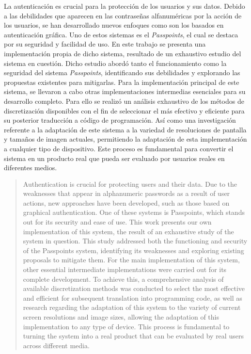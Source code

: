 \begin{resumen}
	La autenticación es crucial para la protección de los usuarios y sus datos. Debido a las debilidades que aparecen en las contraseñas alfanuméricas por la acción de los usuarios, se han desarrollado nuevos enfoques como son los basados en autenticación gráfica. Uno de estos sistemas es el \textit{Passpoints}, el cual se destaca por su seguridad y facilidad de uso. En este trabajo se presenta una implementación propia de dicho sistema, resultado de un exhaustivo estudio del sistema en cuestión. Dicho estudio abordó tanto el funcionamiento como la seguridad del sistema \textit{Passpoints}, identificando sus debilidades y explorando las propuestas existentes para mitigarlas. Para la implementación principal de este sistema, se llevaron a cabo otras implementaciones intermedias esenciales para su desarrollo completo. Para ello se realizó un análisis exhaustivo de los métodos de discretización disponibles con el fin de seleccionar el más efectivo y eficiente para su posterior traducción a código de programación. Así como una investigación referente a la adaptación de este sistema a la variedad de resoluciones de pantalla y tamaños de imagen actuales, permitiendo la adaptación de esta implementación a cualquier tipo de dispositivo. Este proceso es fundamental para convertir el sistema en un producto real que pueda ser evaluado por usuarios reales en diferentes medios.
\end{resumen}

\begin{abstract}
  Authentication is crucial for protecting users and their data. Due to the weaknesses that appear in alphanumeric passwords as a result of user actions, new approaches have been developed, such as those based on graphical authentication. One of these systems is Passpoints, which stands out for its security and ease of use. This work presents our own implementation of this system, the result of an exhaustive study of the system in question. This study addressed both the functioning and security of the Passpoints system, identifying its weaknesses and exploring existing proposals to mitigate them. For the main implementation of this system, other essential intermediate implementations were carried out for its complete development. To achieve this, a comprehensive analysis of available discretization methods was conducted to select the most effective and efficient for subsequent translation into programming code, as well as research regarding the adaptation of this system to the variety of current screen resolutions and image sizes, allowing the adaptation of this implementation to any type of device. This process is fundamental to turning the system into a real product that can be evaluated by real users across different media.
\end{abstract}